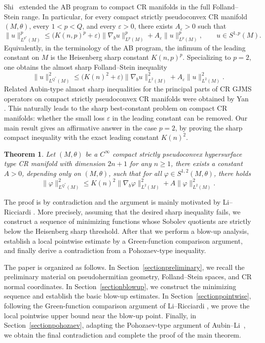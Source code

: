 \documentclass[11pt]{article}
\numberwithin{equation}{section}
\newtheorem{thm}{Theorem}[section]
\newcounter{problem}
\numberwithin{equation}{section}
\begin{document}
	
	Shi~\cite{S2018} extended the AB program to compact CR manifolds in the full Folland--Stein range. In particular, for every compact strictly pseudoconvex CR manifold \((M,\theta)\), every \(1<p<Q\), and every \(\varepsilon>0\), there exists \(A_\varepsilon>0\) such that
	\[
	\|u\|_{L^{p^*}(M)}^p \leq \bigl(K(n,p)^p+\varepsilon\bigr) \|\nabla_bu\|_{L^p(M)}^p + A_\varepsilon\|u\|_{L^p(M)}^p, \qquad u\in S^{1,p}(M).
	\]
	Equivalently, in the terminology of the AB program, the infimum of the leading constant on \(M\) is the Heisenberg sharp constant \(K(n,p)^p\). Specializing to \(p=2\), one obtains the almost sharp Folland--Stein inequality
	\begin{equation}\label{equShi}
		\|u\|_{L^{Q^*}(M)}^2 \leq \bigl(K(n)^2+\varepsilon\bigr)\|\nabla_bu\|_{L^2(M)}^2 + A_\varepsilon\|u\|_{L^2(M)}^2 .
	\end{equation}
	Related Aubin-type almost sharp inequalities for the principal parts of CR GJMS operators on compact strictly pseudoconvex CR manifolds were obtained by Yan \cite[Theorem~1.8]{Y2023}. This naturally leads to the sharp best-constant problem on compact CR manifolds: whether the small loss \(\varepsilon\) in the leading constant can be removed. Our main result gives an affirmative answer in the case \(p=2\), by proving the sharp compact inequality with the exact leading constant \(K(n)^2\).
	
	\begin{thm}\label{Mainthm}
		Let \((M, \theta)\) be a \(C^{\infty}\) compact strictly pseudoconvex  hypersurface type CR manifold with dimension $2n+1$ for any $n\geq 1$,  there exists a constant \(A>0\), depending only on \((M, \theta)\), such that for all \(\varphi \in S^{1, 2}(M, \theta)\), there holds
		\begin{equation}\label{Mainneq}
			\|\varphi\|_{L^{Q^*}(M)}^2 \leq K(n)^2\|\nabla_b \varphi\|_{L^2(M)}^2+A\|\varphi\|_{L^2(M)}^2.
		\end{equation}
	\end{thm}
	The proof is by contradiction and the argument is mainly motivated by Li--Ricciardi \cite{LR2003}. More precisely, assuming that the desired sharp inequality fails, we construct a sequence of minimizing functions whose Sobolev quotients are strictly below the Heisenberg sharp threshold. After that we perform a blow-up analysis, establish a local pointwise estimate by a Green-function comparison argument, and finally derive a contradiction from a Pohozaev-type inequality.
	
	The paper is organized as follows. In Section~\ref{sectionpreliminary}, we recall the preliminary material on pseudohermitian geometry, Folland--Stein spaces, and CR normal coordinates. In Section~\ref{sectionblowup}, we construct the minimizing sequence and establish the basic blow-up estimates. In Section~\ref{sectionpointwise}, following the Green-function comparison argument of Li--Ricciardi \cite{LR2003}, we prove the local pointwise upper bound near the blow-up point. Finally, in Section~\ref{sectionpohozaev}, adapting the Pohozaev-type argument of Aubin--Li~\cite{AL1999}, we obtain the final contradiction and complete the proof of the main theorem.
	
\end{document}
